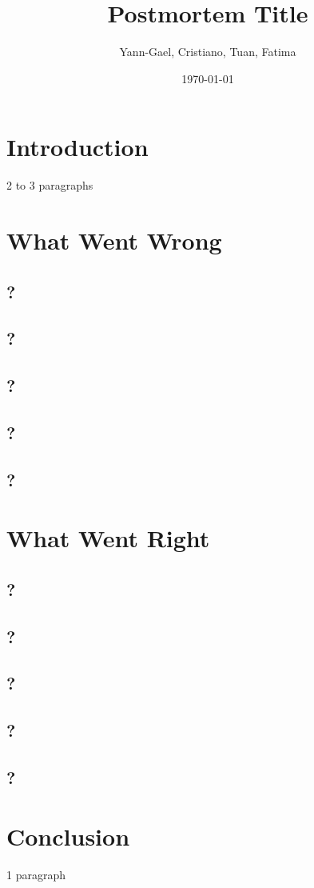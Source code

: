 \documentclass{article}
\title{Postmortem Title}
\author{Yann-Gael, Cristiano, Tuan, Fatima}
\date{\today}
\begin{document}
\maketitle

\section{Introduction}

2 to 3 paragraphs

\section{What Went Wrong}

\subsection{?}
\subsection{?}
\subsection{?}
\subsection{?}
\subsection{?}

\section{What Went Right}

\subsection{?}
\subsection{?}
\subsection{?}
\subsection{?}
\subsection{?}

\section{Conclusion}

1 paragraph
\end{document}
